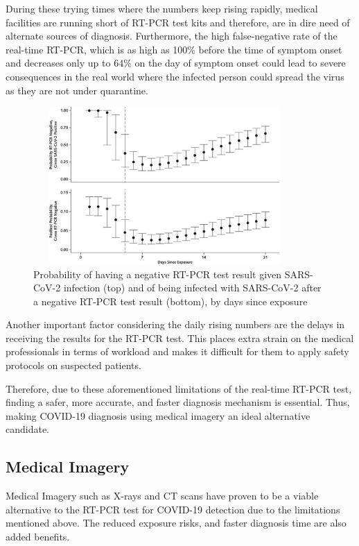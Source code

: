 During these trying times where the numbers keep rising rapidly, medical 
facilities are running short of RT-PCR test kits and therefore, are 
in dire need of alternate sources of diagnosis. Furthermore, 
the high false-negative rate of the real-time RT-PCR, 
which is as high as 100\% before the time of symptom onset 
and decreases only up to 64\% on the day of symptom onset \cite{KLL+2020} could 
lead to severe consequences in the real world where the 
infected person could spread the virus as they are not under quarantine.
\vspace{1em}
\begin{figure}[H]
    \centering
    \includegraphics[width=10cm, height=6cm]{Images/RTPCR.jpg}
    \caption[RT-PCR Test Negative Rate]{Probability of having a negative RT-PCR test result given SARS-CoV-2 infection (top) and of being infected with SARS-CoV-2 after a negative RT-PCR test result (bottom), by days since exposure \cite{KLL+2020}}
    \label{fig:RT-PCR Test Negative Rate}
    \end{figure}
\vspace{-1em}
Another important factor considering the daily rising numbers are the delays in receiving the results for the RT-PCR test. This places extra strain on the medical professionals in terms of workload and makes it difficult for them to apply safety protocols on suspected patients.

Therefore, due to these aforementioned limitations of the real-time RT-PCR test, finding a safer, more accurate, and faster diagnosis mechanism is essential. Thus, making COVID-19 diagnosis using medical imagery an ideal alternative candidate.

\subsection{Medical Imagery} \label{medical imagery}
Medical Imagery such as X-rays and CT scans have proven to be a viable 
alternative to the RT-PCR test for COVID-19 detection 
due to the limitations mentioned above. The reduced exposure risks, and faster 
diagnosis time are also added benefits.

